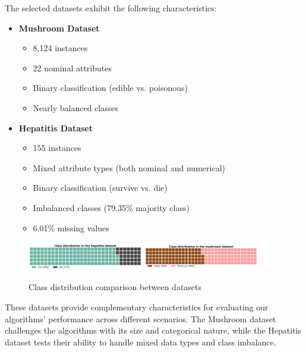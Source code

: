 The selected datasets exhibit the following characteristics:

\begin{itemize}
    \item \textbf{Mushroom Dataset}
    \begin{itemize}
        \item 8,124 instances
        \item 22 nominal attributes
        \item Binary classification (edible vs. poisonous)
        \item Nearly balanced classes
    \end{itemize}
    
    \item \textbf{Hepatitis Dataset}
    \begin{itemize}
        \item 155 instances
        \item Mixed attribute types (both nominal and numerical)
        \item Binary classification (survive vs. die)
        \item Imbalanced classes (79.35\% majority class)
        \item 6.01\% missing values
    \end{itemize}
\end{itemize}

\begin{figure}
    \centering
    \includegraphics[width=0.45\textwidth]{figures/hepatitis-class-distribution.png}
    \includegraphics[width=0.45\textwidth]{figures/mushroom-class-distribution.png}
    \caption{Class distribution comparison between datasets}
    \label{fig:class-distributions}
\end{figure}

These datasets provide complementary characteristics for evaluating our algorithms' performance across different scenarios. The Mushroom dataset challenges the algorithms with its size and categorical nature, while the Hepatitis dataset tests their ability to handle mixed data types and class imbalance.